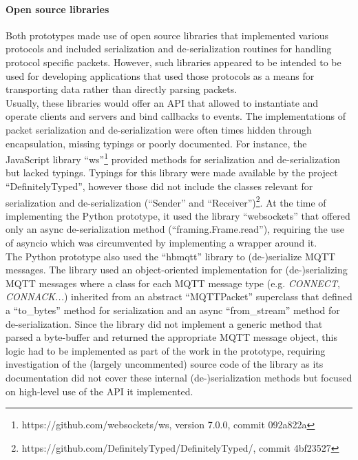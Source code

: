 \paragraph{Open source libraries} Both prototypes made use of open source libraries that implemented various protocols and included serialization and de-serialization routines for handling protocol specific packets. However, such libraries appeared to be intended to be used for developing applications that used those protocols as a means for transporting data rather than directly parsing packets.\\
Usually, these libraries would offer an API that allowed to instantiate and operate clients and servers and bind callbacks to events. The implementations of packet serialization and de-serialization were often times hidden through encapsulation, missing typings or poorly documented. For instance, the JavaScript library \enquote{ws}\footnote{https://github.com/websockets/ws, version 7.0.0, commit 092a822a} provided methods for serialization and de-serialization but lacked typings. Typings for this library were made available by the project \enquote{DefinitelyTyped}, however those did not include the classes relevant for serialization and de-serialization (\enquote{Sender} and \enquote{Receiver})\footnote{https://github.com/DefinitelyTyped/DefinitelyTyped/, commit 4bf23527}.
At the time of implementing the Python prototype, it used the library \enquote{websockets} that offered only an async de-serialization method (\enquote{framing.Frame.read}), requiring the use of asyncio which was circumvented by implementing a wrapper around it.\\
The Python prototype also used the \enquote{hbmqtt} library to (de-)serialize \ac{MQTT} messages. The library used an object-oriented implementation for (de-)serializing \ac{MQTT} messages where a class for each \ac{MQTT} message type (e.g. \emph{CONNECT}, \emph{CONNACK...}) inherited from an abstract \enquote{MQTTPacket} superclass that defined a \enquote{to\_bytes} method for serialization and an async \enquote{from\_stream} method for de-serialization. Since the library did not implement a generic method that parsed a byte-buffer and returned the appropriate \ac{MQTT} message object, this logic had to be implemented as part of the work in the prototype, requiring investigation of the (largely uncommented) source code of the library as its documentation did not cover these internal (de-)serialization methods but focused on high-level use of the API it implemented.\\
